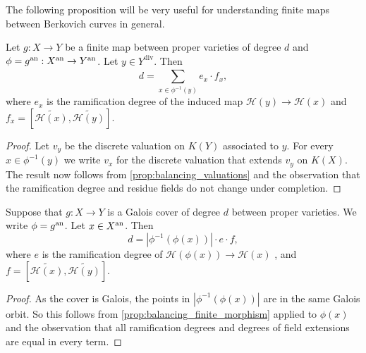 The following proposition will be very useful for understanding finite maps between Berkovich curves in general. 
\begin{proposition}\label{prop:balancing_finite_morphism}
	Let $g: X \to Y$ be a finite map between proper varieties of degree $d$ and $\phi = g\an: X\an \to Y\an$. 
	Let $y \in Y^{\text{div}}$. 
	Then 
	\[
		d = \sum_{x \in \phi^{-1}(y)}^{} e_{x} \cdot  f_{x} 
	,\] 
	where $e_x$ is the ramification degree of the induced map  $\mathcal{H} (y) \to \mathcal{H} (x)$ and $f_x = \left[\widetilde{\mathcal{H} (x)}, \widetilde {\mathcal{H} (y)}\right]$.
\end{proposition}
\begin{proof}
	Let $v_y$ be the discrete valuation on $K(Y)$ associated to $y$. 
	For every $x \in \phi^{-1}(y)$ we write $v_x$ for the discrete valuation that extends $v_y$ on $K(X)$. 
	The result now follows from \cref{prop:balancing_valuations} and the observation that the ramification degree and residue fields do not change under completion. 
\end{proof}

\begin{corollary}\label{cor:balancing_galois_cover}
	Suppose that $g: X \to Y$ is a Galois cover of degree $d$ between proper varieties. 
	We write $\phi = g\an$. 
	Let $x \in X{}^{\text{an}}$. 
	Then \[
		d = |\phi^{-1}(\phi(x))| \cdot e\cdot f
	,\] 
	where $e$ is the ramification degree of $\mathcal{H} (\phi(x)) \to \mathcal{H} (x)$ , and  $f = \left[\widetilde{\mathcal{H} (x)}, \widetilde {\mathcal{H} (y)}\right]$.
\end{corollary}
\begin{proof}
	As the cover is Galois, the points in $|\phi^{-1}(\phi(x))|$ are in the same Galois orbit.
	So this follows from \cref{prop:balancing_finite_morphism} applied to $\phi(x)$ and the observation that all ramification degrees and degrees of field extensions are equal in every term. 
\end{proof}

